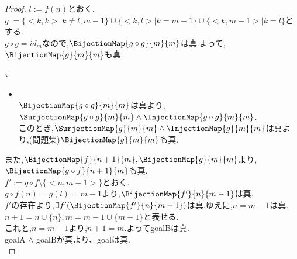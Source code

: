 \begin{proof}
$l:=f(n)$とおく.\\
$g:=\{<k,k> \mid k \neq l, m-1 \} \cup \{<k,l> \mid k = m-1 \} \cup \{<k,m-1> \mid k = l \}$とする.\\
$g \circ g = id_m$なので,$\BijectionMap{g \circ g}{m}{m}$は真.よって,$\BijectionMap{g}{m}{m}$も真.\\

\begin{sub-block}{{\boldmath $\because$}\,}
\begin{itemize}
\item[] \hspace{-0.5cm} \\
	$\BijectionMap{g \circ g}{m}{m}$は真より,$\SurjectionMap{g \circ g}{m}{m} \land \InjectionMap{g \circ g}{m}{m}$.\\
	このとき,$\SurjectionMap{g}{m}{m} \land \InjectionMap{g}{m}{m}$は真より,(問題集)$\BijectionMap{g}{m}{m}$も真.
\end{itemize}
\end{sub-block}

また,$\BijectionMap{f}{n+1}{m}, \BijectionMap{g}{m}{m}$より,$\BijectionMap{g \circ f}{n+1}{m}$も真.\\
$f':= g \circ f \setminus \{<n, m-1>\}$とおく.\\
$g \circ f(n) = g(l) = m-1$より,$\BijectionMap{f'}{n}{m-1}$は真.\\
$f'$の存在より,$\exists f'(\BijectionMap{f'}{n}{m-1})$は真.ゆえに,$n = m-1$は真.\\
$n+1=n \cup \{n\}, m=m-1 \cup \{m-1\}$と表せる.\\
これと,$n=m-1$より,$n+1=m$.よってgoalBは真.\\
goalA $\land$ goalBが真より、goalは真.\\
\end{proof}

